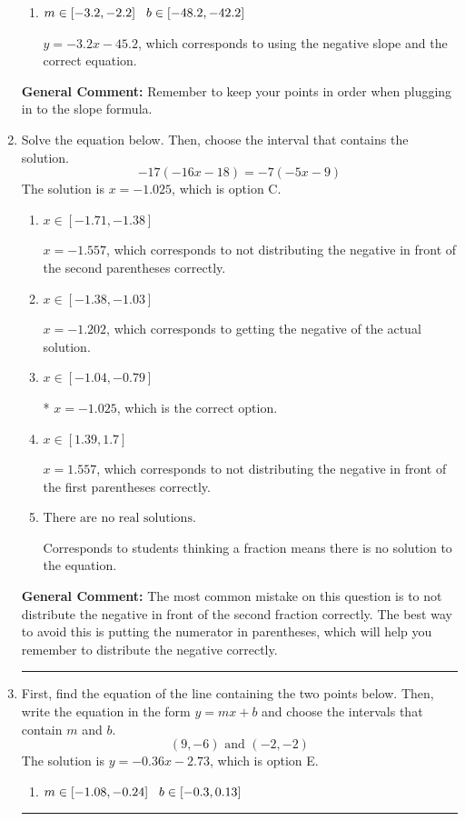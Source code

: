 \documentclass{extbook}[14pt]
\newcommand{\litem}[1]{\item #1

\rule{\textwidth}{0.4pt}}
\begin{document}
\begin{enumerate}
{\begin{enumerate}[label=\Alph*.]
* $y = 3.2x + 25.2$, which is the correct option.
\item \( m \in [-3.2, -2.2] \hspace*{3mm} b \in [-48.2, -42.2] \)

 $y = -3.2x -45.2$, which corresponds to using the negative slope and the correct equation.
\end{enumerate}

\textbf{General Comment:} Remember to keep your points in order when plugging in to the slope formula.
}
\litem{
Solve the equation below. Then, choose the interval that contains the solution.
\[ -17(-16x -18) = -7(-5x -9) \]The solution is \( x = -1.025 \), which is option C.\begin{enumerate}[label=\Alph*.]
\item \( x \in [-1.71, -1.38] \)

$x = -1.557$, which corresponds to not distributing the negative in front of the second parentheses correctly.
\item \( x \in [-1.38, -1.03] \)

$x = -1.202$, which corresponds to getting the negative of the actual solution.
\item \( x \in [-1.04, -0.79] \)

* $x = -1.025$, which is the correct option.
\item \( x \in [1.39, 1.7] \)

$x = 1.557$, which corresponds to not distributing the negative in front of the first parentheses correctly.
\item \( \text{There are no real solutions.} \)

Corresponds to students thinking a fraction means there is no solution to the equation.
\end{enumerate}

\textbf{General Comment:} The most common mistake on this question is to not distribute the negative in front of the second fraction correctly. The best way to avoid this is putting the numerator in parentheses, which will help you remember to distribute the negative correctly.
}
\litem{
First, find the equation of the line containing the two points below. Then, write the equation in the form $ y=mx+b $ and choose the intervals that contain $m$ and $b$.
\[ (9, -6) \text{ and } (-2, -2) \]The solution is \( y = -0.36x -2.73 \), which is option E.\begin{enumerate}[label=\Alph*.]
\item \( m \in [-1.08, -0.24] \hspace*{3mm} b \in [-0.3, 0.13] \)


\end{enumerate}}
\end{enumerate}
\end{document}
